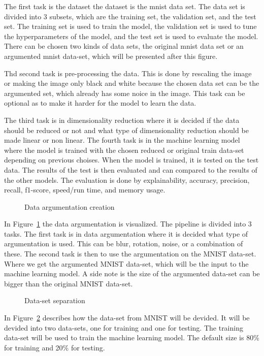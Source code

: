 
The first task is the dataset the dataset is the \gls{mnist} data set. The data set is divided into 3 subsets, which are the training set, the validation set, and the test set. The training set is used to train the model, the validation set is used to tune the hyperparameters of the model, and the test set is used to evaluate the model. There can be chosen two kinds of data sets, the original \gls{mnist} data set or an argumented \gls{mnist} data-set, which will be presented after this figure. 

Thd second task is pre-processing the data. This is done by rescaling the image or making the image only black and white because the chosen data set can be the argumented set, which already has some noice in the image. This task can be optional as to make it harder for the model to learn the data.

The third task is in dimensionality reduction where it is decided if the data should be reduced or not and what type of dimensionality reduction should be made linear or non linear. The fourth task is in the machine learning model where the model is trained with the chosen reduced or original train data-set depending on previous choises. When the model is trained, it is tested on the test data. The results of the test is then evaluated and can compared to the results of the other models. The evaluation is done by explainability, accuracy, precision, recall, f1-score, speed/run time, and memory usage.

\begin{figure}[htb!]
    \centering
    
    \caption{Data argumentation creation}
    \label{fig:data-argumentation-create}
\end{figure}

In Figure~\ref{fig:data-argumentation-create} the data argumentation is visualized. The pipeline is divided into 3 tasks. The first task is in data argumentation where it is decided what type of argumentation is used. This can be blur, rotation, noise, or a combination of these. The second task is then to use the argumentation on the MNIST data-set. Where we get the argumented MNIST data-set, which will be the input to the machine learning model. A side note is the size of the argumented data-set can be bigger than the original MNIST data-set.

\begin{figure}[htb!]
    \centering
    
    \caption{Data-set separation}
    \label{fig:data-set-sepa}
\end{figure}

In Figure~\ref{fig:data-set-sepa} describes how the data-set from MNIST will be devided. It will be devided into two data-sets, one for training and one for testing. The training data-set will be used to train the machine learning model. The default size is 80\% for training and 20\% for testing.